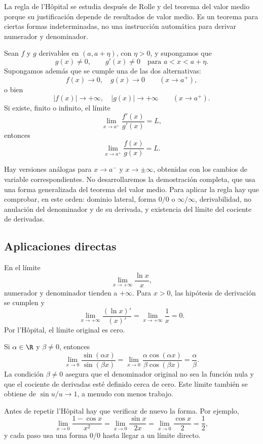 La regla de l'Hôpital se estudia después de Rolle y del teorema del valor
medio porque su justificación depende de resultados de valor medio. Es un
teorema para ciertas formas indeterminadas, no una instrucción automática para
derivar numerador y denominador.

\begin{teorema}
Sean \(f\) y \(g\) derivables en \((a,a+\eta)\), con \(\eta>0\), y supongamos
que
\[
  g(x)\ne0, \qquad g'(x)\ne0
  \quad\text{para }a<x<a+\eta.
\]
Supongamos además que se cumple una de las dos alternativas:
\[
  f(x)\to0,\quad g(x)\to0
  \qquad(x\to a^+),
\]
o bien
\[
  |f(x)|\to+\infty,\quad |g(x)|\to+\infty
  \qquad(x\to a^+).
\]
Si existe, finito o infinito, el límite
\[
  \lim_{x\to a^+}\frac{f'(x)}{g'(x)}=L,
\]
entonces
\[
  \lim_{x\to a^+}\frac{f(x)}{g(x)}=L.
\]
\end{teorema}

Hay versiones análogas para \(x\to a^-\) y \(x\to\pm\infty\), obtenidas con
los cambios de variable correspondientes. No desarrollaremos la demostración
completa, que usa una forma generalizada del teorema del valor medio. Para
aplicar la regla hay que comprobar, en este orden: dominio lateral, forma
\(0/0\) o \(\infty/\infty\), derivabilidad, no anulación del denominador y de
su derivada, y existencia del límite del cociente de derivadas.

\subsection{Aplicaciones directas}

En el límite
\[
  \lim_{x\to+\infty}\frac{\ln x}{x},
\]
numerador y denominador tienden a \(+\infty\). Para \(x>0\), las hipótesis de
derivación se cumplen y
\[
  \lim_{x\to+\infty}\frac{(\ln x)'}{(x)'}
  =\lim_{x\to+\infty}\frac1x=0.
\]
Por l'Hôpital, el límite original es cero.

Si \(\alpha\in\R\) y \(\beta\ne0\), entonces
\[
 \lim_{x\to0}\frac{\sin(\alpha x)}{\sin(\beta x)}
 =\lim_{x\to0}
   \frac{\alpha\cos(\alpha x)}{\beta\cos(\beta x)}
 =\frac\alpha\beta.
\]
La condición \(\beta\ne0\) asegura que el denominador original no sea la
función nula y que el cociente de derivadas esté definido cerca de cero. Este
límite también se obtiene de \(\sin u/u\to1\), a menudo con menos trabajo.

Antes de repetir l'Hôpital hay que verificar de nuevo la forma. Por ejemplo,
\[
 \lim_{x\to0}\frac{1-\cos x}{x^2}
 =\lim_{x\to0}\frac{\sin x}{2x}
 =\lim_{x\to0}\frac{\cos x}{2}
 =\frac12,
\]
y cada paso usa una forma \(0/0\) hasta llegar a un límite directo.

